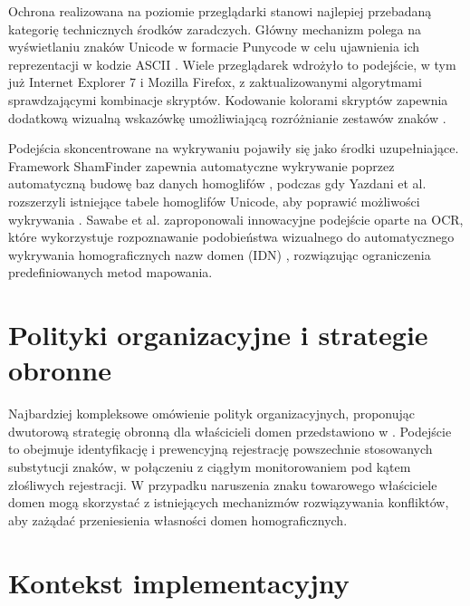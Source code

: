 Ochrona realizowana na poziomie przeglądarki stanowi najlepiej przebadaną kategorię technicznych środków zaradczych. Główny mechanizm polega na wyświetlaniu znaków Unicode w formacie Punycode w celu ujawnienia ich reprezentacji w kodzie ASCII \cite{McElroy2017}. Wiele przeglądarek wdrożyło to podejście, w tym już Internet Explorer 7 \cite{McElroy2017} i Mozilla Firefox, z zaktualizowanymi algorytmami sprawdzającymi kombinacje skryptów. Kodowanie kolorami skryptów zapewnia dodatkową wizualną wskazówkę umożliwiającą rozróżnianie zestawów znaków \cite{McElroy2017}.

Podejścia skoncentrowane na wykrywaniu pojawiły się jako środki uzupełniające. Framework ShamFinder zapewnia automatyczne wykrywanie poprzez automatyczną budowę baz danych homoglifów \cite{Suzuki2019}, podczas gdy Yazdani et al. rozszerzyli istniejące tabele homoglifów Unicode, aby poprawić możliwości wykrywania \cite{Yazdani2020}. Sawabe et al. zaproponowali innowacyjne podejście oparte na OCR, które wykorzystuje rozpoznawanie podobieństwa wizualnego do automatycznego wykrywania homograficznych nazw domen (IDN) \cite{Sawabe2019}, rozwiązując ograniczenia predefiniowanych metod mapowania.

\section{Polityki organizacyjne i strategie obronne}
Najbardziej kompleksowe omówienie polityk organizacyjnych, proponując dwutorową strategię obronną dla właścicieli domen przedstawiono w \cite{Quinkert}. Podejście to obejmuje identyfikację i prewencyjną rejestrację powszechnie stosowanych substytucji znaków, w połączeniu z ciągłym monitorowaniem pod kątem złośliwych rejestracji. W przypadku naruszenia znaku towarowego właściciele domen mogą skorzystać z istniejących mechanizmów rozwiązywania konfliktów, aby zażądać przeniesienia własności domen homograficznych.

\section{Kontekst implementacyjny}

